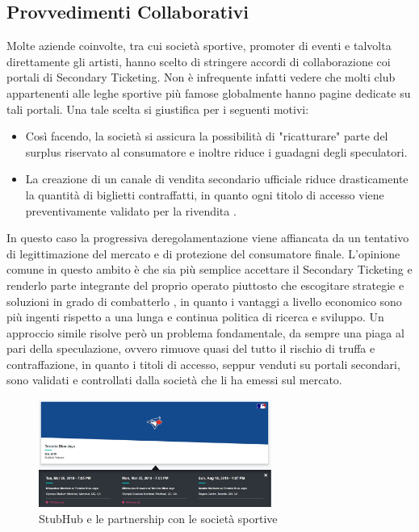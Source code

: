 \subsection {Provvedimenti Collaborativi}
Molte aziende coinvolte, tra cui società sportive, promoter di eventi e talvolta direttamente gli artisti, hanno scelto di stringere accordi di collaborazione coi portali di Secondary Ticketing. Non è infrequente infatti vedere che molti club appartenenti alle leghe sportive più famose globalmente hanno pagine dedicate su tali portali. Una tale scelta si giustifica per i seguenti motivi: 
\begin{itemize}
\item Così facendo, la società si assicura la possibilità di "ricatturare" parte del surplus riservato al consumatore e inoltre riduce i guadagni degli speculatori.
\item La creazione di un canale di vendita secondario ufficiale riduce drasticamente la quantità di biglietti contraffatti, in quanto ogni titolo di accesso viene preventivamente validato per la rivendita \cite{shapiro2014examination}.
\end{itemize}
In questo caso la progressiva deregolamentazione viene affiancata da un tentativo di legittimazione del mercato e di protezione del consumatore finale. L'opinione comune in questo ambito è che sia più semplice accettare il Secondary Ticketing e renderlo parte integrante del proprio operato piuttosto che escogitare strategie e soluzioni in grado di combatterlo \cite{simon2003if}, in quanto i vantaggi a livello economico sono più ingenti rispetto a una lunga e continua politica di ricerca e sviluppo. 
Un approccio simile risolve però un problema fondamentale, da sempre una piaga al pari della speculazione, ovvero rimuove quasi del tutto il rischio di truffa e contraffazione, in quanto i titoli di accesso, seppur venduti su portali secondari, sono validati e controllati dalla società che li ha emessi sul mercato. 
\begin{figure}[H]
	\centering
	\includegraphics[width=0.68\textwidth]{chapter3/immagini/StubHub_Club}
	\caption{StubHub e le partnership con le società sportive}
	\label{stubhub_part}
\end{figure}
